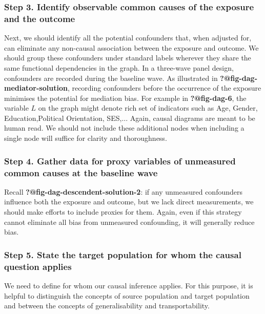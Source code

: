 \documentclass[
  singlecolumn]{article}
\begin{document}
\subsubsection{Step 3. Identify observable common causes of the exposure
and the
outcome}\label{step-3.-identify-observable-common-causes-of-the-exposure-and-the-outcome}

Next, we should identify all the potential confounders that, when
adjusted for, can eliminate any non-causal association between the
exposure and outcome. We should group these confounders under standard
labels wherever they share the same functional dependencies in the
graph. In a three-wave panel design, confounders are recorded during the
baseline wave. As illustrated in \textbf{?@fig-dag-mediator-solution},
recording confounders before the occurrence of the exposure minimises
the potential for mediation bias. For example in \textbf{?@fig-dag-6},
the variable \(L\) on the graph might denote rich set of indicators such
as Age, Gender, Education,Political Orientation, SES,\(\dots\) Again,
causal diagrams are meant to be human read. We should not include these
additional nodes when including a single node will suffice for clarity
and thoroughness.

\subsubsection{Step 4. Gather data for proxy variables of unmeasured
common causes at the baseline
wave}\label{step-4.-gather-data-for-proxy-variables-of-unmeasured-common-causes-at-the-baseline-wave}

Recall \textbf{?@fig-dag-descendent-solution-2}: if any unmeasured
confounders influence both the exposure and outcome, but we lack direct
measurements, we should make efforts to include proxies for them. Again,
even if this strategy cannot eliminate all bias from unmeasured
confounding, it will generally reduce bias.

\subsubsection{Step 5. State the target population for whom the causal
question
applies}\label{step-5.-state-the-target-population-for-whom-the-causal-question-applies}

We need to define for whom our causal inference applies. For this
purpose, it is helpful to distinguish the concepts of source population
and target population and between the concepts of generalisability and
transportability.
\end{document}

